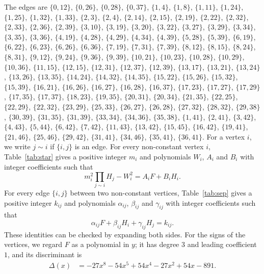 \documentclass[11pt]{article}
\begin{document}
The edges are $\{0,12\}$, $\{0,26\}$, $\{0,28\}$, $\{0,37\}$, $\{1,4\}$, $\{1,8\}$, $\{1,11\}$, $\{1,24\}$, $\{1,25\}$, $\{1,32\}$, $\{1,33\}$, $\{2,3\}$, $\{2,4\}$, $\{2,14\}$, $\{2,15\}$, $\{2,19\}$, $\{2,22\}$, $\{2,32\}$, $\{2,33\}$, $\{2,36\}$, $\{2,39\}$, $\{3,10\}$, $\{3,19\}$, $\{3,20\}$, $\{3,22\}$, $\{3,27\}$, $\{3,29\}$, $\{3,34\}$, $\{3,35\}$, $\{3,36\}$, $\{4,19\}$, $\{4,28\}$, $\{4,29\}$, $\{4,34\}$, $\{4,39\}$, $\{5,28\}$, $\{5,39\}$, $\{6,19\}$, $\{6,22\}$, $\{6,23\}$, $\{6,26\}$, $\{6,36\}$, $\{7,19\}$, $\{7,31\}$, $\{7,39\}$, $\{8,12\}$, $\{8,15\}$, $\{8,24\}$, $\{8,31\}$, $\{9,12\}$, $\{9,24\}$, $\{9,36\}$, $\{9,39\}$, $\{10,21\}$, $\{10,23\}$, $\{10,28\}$, $\{10,29\}$, $\{10,36\}$, $\{11,15\}$, $\{12,15\}$, $\{12,31\}$, $\{12,37\}$, $\{12,39\}$, $\{13,17\}$, $\{13,21\}$, $\{13,24\}$, $\{13,26\}$, $\{13,35\}$, $\{14,24\}$, $\{14,32\}$, $\{14,35\}$, $\{15,22\}$, $\{15,26\}$, $\{15,32\}$, $\{15,39\}$, $\{16,21\}$, $\{16,26\}$, $\{16,27\}$, $\{16,28\}$, $\{16,37\}$, $\{17,23\}$, $\{17,27\}$, $\{17,29\}$, $\{17,35\}$, $\{17,37\}$, $\{18,23\}$, $\{19,35\}$, $\{20,31\}$, $\{20,34\}$, $\{21,35\}$, $\{22,25\}$, $\{22,29\}$, $\{22,32\}$, $\{23,29\}$, $\{25,33\}$, $\{26,27\}$, $\{26,28\}$, $\{27,32\}$, $\{28,32\}$, $\{29,38\}$, $\{30,39\}$, $\{31,35\}$, $\{31,39\}$, $\{33,34\}$, $\{34,36\}$, $\{35,38\}$, $\{1,41\}$, $\{2,41\}$, $\{3,42\}$, $\{4,43\}$, $\{5,44\}$, $\{6,42\}$, $\{7,42\}$, $\{11,43\}$, $\{13,42\}$, $\{15,45\}$, $\{16,42\}$, $\{19,41\}$, $\{21,46\}$, $\{25,46\}$, $\{29,42\}$, $\{31,41\}$, $\{34,46\}$, $\{35,41\}$, $\{36,41\}$. For a vertex $i$, we write $j\sim i$ if $\{i,j\}$ is an edge.
For every non-constant vertex $i$, Table~\ref{tab:star} gives a positive integer $m_{i}$ and polynomials $W_{i}$, $A_{i}$ and $B_{i}$ with integer coefficients such that
\begin{equation}\label{eq:star}
m_i^2\prod_{j\sim i}H_j-W_i^2=A_iF+B_iH_i.
\end{equation}
For every edge $\{i,j\}$ between two non-constant vertices, Table~\ref{tab:sep} gives a positive integer $k_{ij}$ and polynomials $\alpha_{ij}$, $\beta_{ij}$ and $\gamma_{ij}$ with integer coefficients such that
\begin{equation}\label{eq:sep}
\alpha_{ij}F+\beta_{ij}H_i+\gamma_{ij}H_j=k_{ij}.
\end{equation}
These identities can be checked by expanding both sides.
For the signs of the vertices, we regard $F$ as a polynomial in $y$; it has degree $3$ and leading coefficient $1$, and its discriminant is
\begin{align*}
\Delta(x)&=-27x^{8}-54x^{5}+54x^{4}-27x^{2}+54x-891.
\end{align*}
\end{document}
